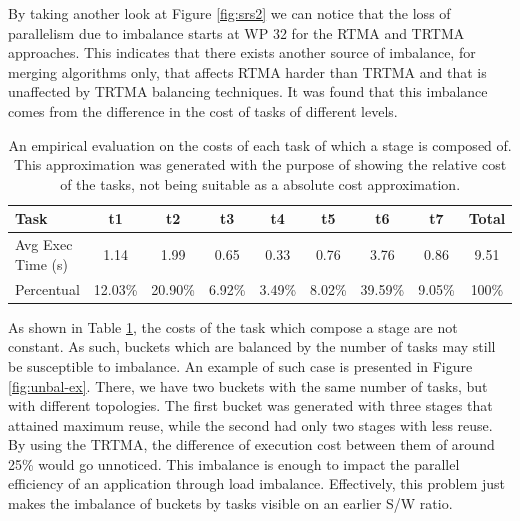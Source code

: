 By taking another look at Figure \ref{fig:srs2} we can notice that the loss of parallelism due to imbalance starts at WP 32 for the RTMA and TRTMA approaches. This indicates that there exists another source of imbalance, for merging algorithms only, that affects RTMA harder than TRTMA and that is unaffected by TRTMA balancing techniques. It was found that this imbalance comes from the difference in the cost of tasks of different levels.

\begin{center}
\begin{table}[b]%
\centering
\begin{tabular*}{460pt}{@{\extracolsep\fill}lcccccccc@{\extracolsep\fill}}
\toprule
Task 				&	t1	&	t2	&	t3	&	t4	&	t5	&	t6	&	t7	&	Total\\
\midrule
Avg Exec Time (s)	&	1.14	&	1.99	&	0.65	&	0.33	&	0.76	&	3.76	&	0.86	&	9.51	\\
Percentual			&	12.03\%	&	20.90\%	&	6.92\%	&	3.49\%	&	8.02\%	&	39.59\%	&	9.05\%	&	100\%	\\
\bottomrule
\end{tabular*}
\caption{An empirical evaluation on the costs of each task of which a stage is composed of. This approximation was generated with the purpose of showing the relative cost of the tasks, not being suitable as a absolute cost approximation. \label{tab:profile}}
\end{table}
\vspace*{-3ex}
\end{center}

As shown in Table \ref{tab:profile}, the costs of the task which compose a stage are not constant. As such, buckets which are balanced by the number of tasks may still be susceptible to imbalance. An example of such case is presented in Figure \ref{fig:unbal-ex}. There, we have two buckets with the same number of tasks, but with different topologies. The first bucket was generated with three stages that attained maximum reuse, while the second had only two stages with less reuse. By using the TRTMA, the difference of execution cost between them of around 25\% would go unnoticed. This imbalance is enough to impact the parallel efficiency of an application through load imbalance. Effectively, this problem just makes the imbalance of buckets by tasks visible on an earlier S/W ratio.

